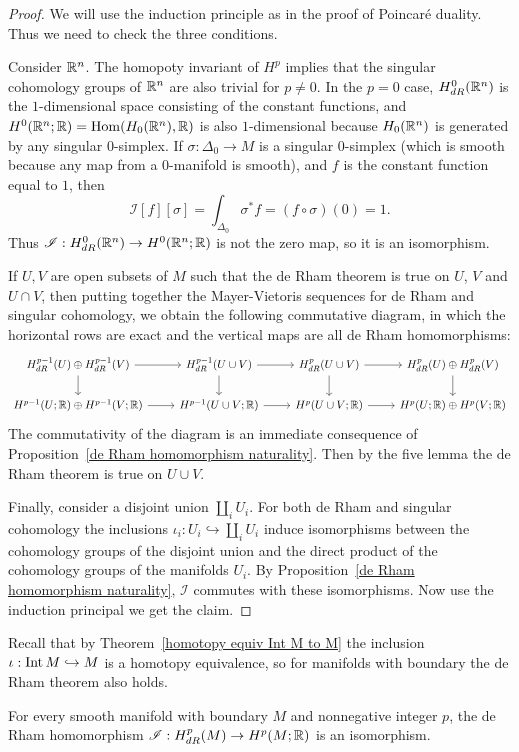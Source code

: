 \begin{proof}
We will use the induction principle as in the proof of Poincar\'e duality. Thus we need to check the three conditions.\par
Consider $\mathbb{R}^n$. The homopoty invariant of $H^p$ implies that the singular cohomology groups of $\mathbb{R}^n$ are also trivial for $p\neq 0$. In the $p=0$ case, $H^0_{dR}(\mathbb{R}^n)$ 
is the $1$-dimensional space consisting of the constant functions, and $H^0(\mathbb{R}^n;\mathbb{R})=\mathrm{Hom}(H_0(\mathbb{R}^n),\mathbb{R})$ is also $1$-dimensional because $H_0(\mathbb{R}^n)$ is generated by any 
singular $0$-simplex. If $\sigma:\Delta_0\to M$ is a singular $0$-simplex (which is smooth because any map from a $0$-manifold is smooth), and $f$ is the constant function 
equal to $1$, then
\[\mathscr{I}[f][\sigma]=\int_{\Delta_0}\sigma^*f=(f\circ\sigma)(0)=1.\]
Thus $\mathscr{I}:H^0_{dR}(\mathbb{R}^n)\to H^0(\mathbb{R}^n;\mathbb{R})$ is not the zero map, so it is an isomorphism.\par
If $U,V$ are open subsets of $M$ such that the de Rham theorem is true on $U$, $V$ and $U\cap V$, then putting together the Mayer-Vietoris sequences for de Rham and 
singular cohomology, we obtain the following commutative diagram, in which the horizontal rows are exact and the vertical maps are all de Rham homomorphisms:
\[\begin{tikzcd}[scale=0.85]
H_{dR}^{p-1}(U)\oplus H_{dR}^{p-1}(V)\ar[r]\ar[d]&H^{p-1}_{dR}(U\cup V)\ar[r]\ar[d]&H^p_{dR}(U\cup V)\ar[r]\ar[d]&H^p_{dR}(U)\oplus H^p_{dR}(V)\ar[d]\\
H^{p-1}(U;\R)\oplus H^{p-1}(V;\R)\ar[r]&H^{p-1}(U\cup V;\R)\ar[r]&H^p(U\cup V;\R)\ar[r]&H^p(U;\R)\oplus H^p(V;\R)
\end{tikzcd}\]
The commutativity of the diagram is an immediate consequence of Proposition~\ref{de Rham homomorphism naturality}. Then by the five lemma the de Rham theorem is true on 
$U\cup V$.\par
Finally, consider a disjoint union $\amalg_iU_i$. For both de Rham and singular cohomology the inclusions $\iota_i:U_i\hookrightarrow\amalg_iU_i$ induce isomorphisms 
between the cohomology groups of the disjoint union and the direct product of the cohomology groups of the manifolds $U_i$. By Proposition~\ref{de Rham homomorphism naturality}, 
$\mathscr{I}$ commutes with these isomorphisms. Now use the induction principal we get the claim.
\end{proof}
Recall that by Theorem~\ref{homotopy equiv Int M to M} the inclusion $\iota:\mathrm{Int}\, M\hookrightarrow M$ is a homotopy equivalence, so for manifolds with boundary the de Rham theorem also holds.
\begin{proposition}
For every smooth manifold with boundary $M$ and nonnegative integer $p$, the de Rham homomorphism $\mathscr{I}:H^p_{dR}(M)\to H^p(M;\mathbb{R})$ is an isomorphism.
\end{proposition}

